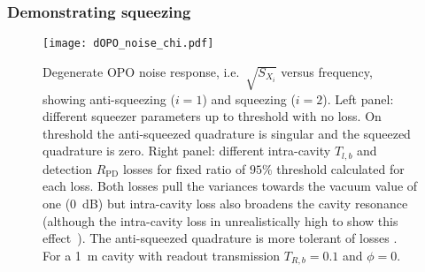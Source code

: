 

\subsubsection{Demonstrating squeezing}

\begin{figure}
	\centering
	\texttt{[image: dOPO\_noise\_chi.pdf]}
	\caption{ Degenerate OPO noise response, i.e.\ $\sqrt{S_{X_i}}$ versus frequency, showing anti-squeezing ($i=1$) and squeezing ($i=2$). Left panel: different squeezer parameters up to threshold with no loss. On threshold the anti-squeezed quadrature is singular and the squeezed quadrature is zero. Right panel: different intra-cavity $T_{l,b}$ and detection $R_\text{PD}$ losses for fixed ratio of $95\%$ threshold calculated for each loss. Both losses pull the variances towards the vacuum value of one (0~dB) but intra-cavity loss also broadens the cavity resonance (although the intra-cavity loss in unrealistically high to show this effect~\cite{}). The anti-squeezed quadrature is more tolerant of losses . For a 1~m cavity with readout transmission $T_{R,b}=0.1$ and $\phi=0$.}
	\label{fig:dOPO_variances}
\end{figure}

